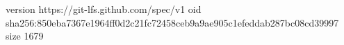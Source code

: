 version https://git-lfs.github.com/spec/v1
oid sha256:850eba7367e1964ff0d2c21fc72458ceb9a9ae905c1efeddab287bc08cd39997
size 1679
